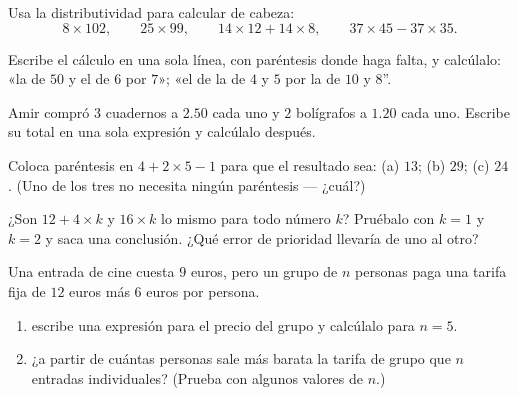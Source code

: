 \begin{exercise}[$\star$]\label{exo:g7:priorities:5}
Usa la distributividad para calcular de cabeza:
\[
8 \times 102, \qquad
25 \times 99, \qquad
14 \times 12 + 14 \times 8, \qquad
37 \times 45 - 37 \times 35 .
\]
\end{exercise}

\begin{exercise}[$\star$]\label{exo:g7:priorities:6}
Escribe el cálculo en una sola línea, con paréntesis donde haga falta, y
calcúlalo: «la  de $50$ y el  de $6$ por $7$»;
«el  de la  de $4$ y $5$ por la  de $10$ y
$8$''.
\end{exercise}

\begin{exercise}[$\star$]\label{exo:g7:priorities:7}
Amir compró $3$ cuadernos a $2.50$ cada uno y $2$ bolígrafos a $1.20$ cada uno.
Escribe su total en una sola expresión y calcúlalo después.
\end{exercise}

\begin{exercise}[$\star\star$]\label{exo:g7:priorities:8}
Coloca paréntesis en $4 + 2 \times 5 - 1$ para que el resultado sea: (a) $13$;
(b) $29$; (c) $24$. (Uno de los tres no necesita ningún paréntesis ---
¿cuál?)
\end{exercise}

\begin{exercise}[$\star\star$]\label{exo:g7:priorities:9}
¿Son $12 + 4 \times k$ y $16 \times k$ lo mismo para todo número $k$?
Pruébalo con $k = 1$ y $k = 2$ y saca una conclusión. ¿Qué error de prioridad
llevaría de uno al otro?
\end{exercise}

\begin{exercise}[$\star\star$]\label{exo:g7:priorities:10}
Una entrada de cine cuesta $9$ euros, pero un grupo de $n$ personas paga una tarifa fija
de $12$ euros más $6$ euros por persona.
\begin{enumerate}
  \item escribe una expresión para el precio del grupo y calcúlalo para
        $n = 5$.
  \item ¿a partir de cuántas personas sale más barata la tarifa de grupo que $n$
        entradas individuales? (Prueba con algunos valores de $n$.)
\end{enumerate}
\end{exercise}

